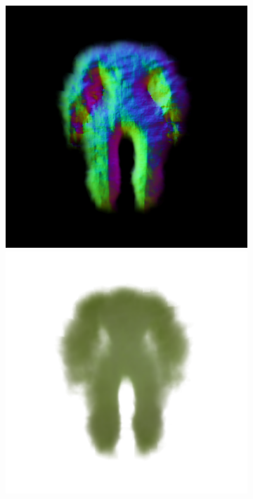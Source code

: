 \begin{figure}[ht]
\begin{subfigure}[b]{0.222\textwidth}
        \includegraphics[width=\textwidth]{figures/appendix/magic123_coarse_robot_back_0_part2.png}
        \includegraphics[width=\textwidth]{figures/appendix/magic123_coarse_robot_back_0_part1.png}

\end{subfigure}
\end{figure}
